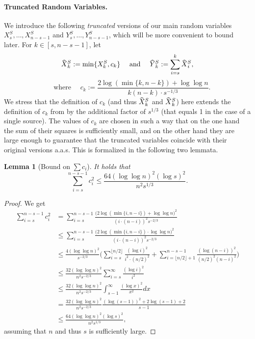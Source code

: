 \documentclass[a4paper,11pt]{article}
\theoremstyle{definition}
\theoremstyle{plain}
\newtheorem{lemma}{Lemma}
\newcommand{\capped}[1]{\hstretch{2}{\hat{\hstretch{.5}{#1}}}}
\begin{document}
\paragraph*{Truncated Random Variables.}
We introduce the following \emph{truncated} versions of our main random variables $X^S_{s}, \ldots, X^S_{n-s-1}$ and $Y^S_{s}, \ldots, Y^S_{n-s-1}$,
which will be more convenient to bound later.
For $k\in [s, n-s-1]$, let
\[
  \capped{X}^S_k := \min \{ X^S_k, c_k \} \quad\text{ and }\quad
  \capped{Y}^S_k := \sum_{i=s}^{k} \capped{X}^S_i, 
\]\[
\quad \text{ where } \quad
  c_{k} := \frac{2 \log{(\min\{ k, n-k\})} + \log \log{n}}{k(n-k) \cdot s^{-1/3}}.
\]
We stress that the definition of $c_k$ (and thus $\capped{X}^S_k$ and $\capped{X}^S_k$) here extends the definition of $c_k$ from \cite{CasteigtsRRZ21} by the additional factor of $s^{1/3}$ (that equals 1 in the case of a single source).
The values of $c_k$ are chosen in such a way that on the one hand the sum of their squares is sufficiently small,
and on the other hand they are large enough to guarantee that the truncated variables coincide
with their original versions a.a.s. This is formalized in the following two lemmata.
\begin{lemma}[Bound on $\sum c_i$]\label{lm:ck_bound}
    It holds that
    \[
      \sum_{i=s}^{n-s-1} c_i^2 \leq \frac{64 (\log \log{n})^2(\log s)^2}{n^2s^{1/3}}.
    \]
\end{lemma}
\begin{proof}
  We get
  \begin{equation*}
    \begin{split}
      \sum_{i=s}^{n-s-1} c_i^2
      & = \sum_{i=s}^{n-s-1}\frac{\big(2 \log{(\min\{i, n- i\})} + \log \log{n}\big)^2}{(i\cdot (n- i))^2s^{-2/3}}
      \\ &\leq \sum_{i=s}^{n-s-1}\frac{\big(2 \log{(\min\{i, n- i\})} \cdot \log \log{n}\big)^2}{(i\cdot (n- i))^2s^{-2/3}}
      \\ &\leq \frac{4 (\log\log{n})^2}{s^{-2/3}} \Bigg( \sum_{i=s}^{\lfloor n/2 \rfloor}
      \frac{(\log i )^2}{ i^2\cdot (n/2)^2}
      + \sum_{i=\lfloor n/2 \rfloor+1}^{n-s-1} \frac{(\log(n- i))^2}{(n/2)^2(n- i)^2} \Bigg)
      \\ &\leq \frac{32 (\log \log{n})^2}{n^2s^{-2/3}} \sum_{i=s}^{\infty}\frac{(\log{i})^2}{i^2}
      \\ &\leq \frac{32 (\log \log{n})^2}{n^2s^{-2/3}} \int_{s-1}^{\infty}\frac{(\log{x})^2}{x^2}dx
      \\ &= \frac{32 (\log \log{n})^2}{n^2s^{-2/3}}\frac{(\log(s-1))^2 + 2 \log(s-1) + 2}{s - 1}
      \\ &\leq \frac{64 (\log \log{n})^2 (\log s)^2}{n^2s^{1/3}},
    \end{split}
  \end{equation*}
  assuming that $n$ and thus $s$ is sufficiently large.
\end{proof}
\end{document}
